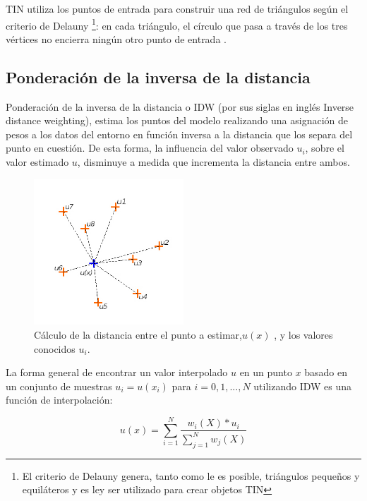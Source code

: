 TIN utiliza los puntos de entrada para construir una red de triángulos según el criterio de Delauny
\footnote{El criterio de Delauny genera, tanto como le es posible, triángulos pequeños y
equiláteros y es ley ser utilizado para crear objetos TIN}: en cada triángulo, el círculo que pasa
a través de los tres vértices no encierra ningún otro punto de entrada \citep{cPachecoMDE2003}.

\subsection{Ponderación de la inversa de la distancia}
Ponderación de la inversa de la distancia o IDW (por sus siglas en inglés Inverse distance
weighting), estima los puntos del modelo realizando una asignación de pesos a los datos del
entorno en función inversa a la distancia que los separa del punto en cuestión. De esta forma,
la influencia del valor observado $u_{i}$, sobre el valor estimado $u$, disminuye a medida que incrementa la distancia entre ambos.


\begin{figure}[H]
\centering
\includegraphics[width=0.5\textwidth]{capitulo-2/graphics/idw-distancia.jpg}
\caption{\label{fig:sig-idw-distancia}Cálculo de la distancia entre el punto a estimar,$u(x)$ , y los valores conocidos $u_{i}$.}

\end{figure}

La forma general de encontrar un valor interpolado $u$ en un punto $x$ basado en un conjunto de
muestras $u_i = u (x_i)$ para $i = 0,1, ..., N$ utilizando IDW es una función de interpolación:

\begin{equation}\label{eq:interpolacion-idw}
 u(x) = \sum_{i=1}^{N} \frac{w_i(X) * u_{i}}{\sum_{j=1}^{N} w_j(X)}
\end{equation}

